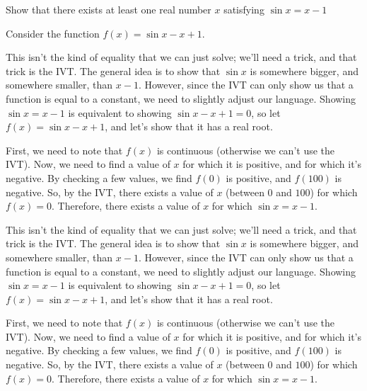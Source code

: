 \begin{Mquestion}
Show that there exists at least one real number $x$ satisfying $\sin x = x-1$
\end{Mquestion}
\begin{hint}
Consider the function $f(x)=\sin x - x +1$.
\end{hint}
\begin{answer}
This isn't the kind of equality that we can just solve; we'll need a trick, and that trick is the IVT. The general idea is to show that $\sin x$ is somewhere bigger, and somewhere smaller, than $x-1$. However, since the IVT can only show us that a function is equal to a constant, we need to slightly adjust our language. Showing $\sin x = x-1$ is equivalent to showing $\sin x - x + 1 = 0$, so let $f(x)=\sin x - x +1$, and let's show that it has a real root.

First, we need to note that $f(x)$ is continuous (otherwise we can't use the IVT). Now, we need to find a value of $x$ for which it is positive, and for which it's negative. By checking a few values, we find $f(0)$ is positive, and $f(100)$ is negative.  So, by the IVT, there exists a value of $x$ (between $0$ and $100$) for which $f(x)=0$. Therefore, there exists a value of $x$ for which $\sin x = x-1$.
\end{answer}
\begin{solution}
This isn't the kind of equality that we can just solve; we'll need a trick, and that trick is the IVT. The general idea is to show that $\sin x$ is somewhere bigger, and somewhere smaller, than $x-1$. However, since the IVT can only show us that a function is equal to a constant, we need to slightly adjust our language. Showing $\sin x = x-1$ is equivalent to showing $\sin x - x + 1 = 0$, so let $f(x)=\sin x - x +1$, and let's show that it has a real root.

First, we need to note that $f(x)$ is continuous (otherwise we can't use the IVT). Now, we need to find a value of $x$ for which it is positive, and for which it's negative. By checking a few values, we find $f(0)$ is positive, and $f(100)$ is negative.  So, by the IVT, there exists a value of $x$ (between $0$ and $100$) for which $f(x)=0$. Therefore, there exists a value of $x$ for which $\sin x = x-1$.\end{solution}


